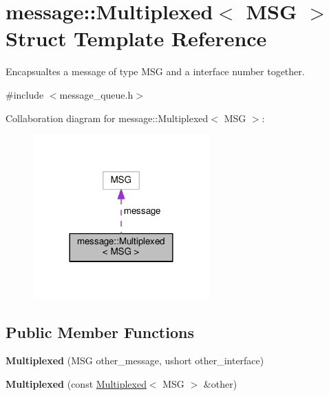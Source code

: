 \hypertarget{structmessage_1_1Multiplexed}{}\section{message\+:\+:Multiplexed$<$ M\+SG $>$ Struct Template Reference}
\label{structmessage_1_1Multiplexed}


Encapsualtes a message of type M\+SG and a interface number together.  




{\ttfamily \#include $<$message\+\_\+queue.\+h$>$}



Collaboration diagram for message\+:\+:Multiplexed$<$ M\+SG $>$\+:\nopagebreak
\begin{figure}[H]
\begin{center}
\leavevmode
\includegraphics[width=192pt]{structmessage_1_1Multiplexed__coll__graph}
\end{center}
\end{figure}
\subsection*{Public Member Functions}
\begin{DoxyCompactItemize}
\item 
{\bfseries Multiplexed} (M\+SG other\+\_\+message, ushort other\+\_\+interface)\hypertarget{structmessage_1_1Multiplexed_ac93f435186dd43948070bfe4dbe5fcd2}{}\label{structmessage_1_1Multiplexed_ac93f435186dd43948070bfe4dbe5fcd2}

\item 
{\bfseries Multiplexed} (const \hyperlink{structmessage_1_1Multiplexed}{Multiplexed}$<$ M\+SG $>$ \&other)\hypertarget{structmessage_1_1Multiplexed_afafed38c7ee409a2544fa11b8b523217}{}\label{structmessage_1_1Multiplexed_afafed38c7ee409a2544fa11b8b523217}

\end{DoxyCompactItemize}
